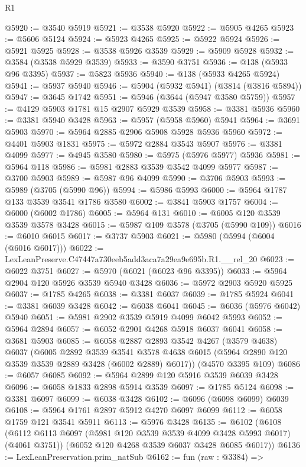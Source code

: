 \begin{lexlean}{R1}
\begin{coremodule}
@5920 := @3540 @5919
@5921 := @3538 @5920
@5922 := @5905 @4265
@5923 := @5606 @5124
@5924 := @5923 @4265
@5925 := @5922 @5924
@5926 := @5921 @5925
@5928 := @3538 @5926 @3539
@5929 := @5909 @5928
@5932 := @3584 (@3538 @5929 @3539)
@5933 := @3590 @3751
@5936 := @138 (@5933 @96 @3395)
@5937 := @5823 @5936
@5940 := @138 (@5933 @4265 @5924)
@5941 := @5937 @5940
@5946 := @5904 (@5932 @5941) (@3814 (@3816 @5894))
@5947 := @3645 @1742
@5951 := @5946 (@3644 (@5947 @3580 @5759))
@5957 := @4129 @5903 @1781 @15 @2907 @5929 @3539
@5958 := @3381 @5936
@5960 := @3381 @5940 @3428
@5963 := @5957 (@5958 @5960) @5941
@5964 := @3691 @5903
@5970 := @5964 @2885 @2906 @5908 @5928 @5936 @5960
@5972 := @4401 @5903 @1831
@5975 := @5972 @2884 @3543 @5907
@5976 := @3381 @4099
@5977 := @4945 @3580
@5980 := @5975 (@5976 @5977) @5936
@5981 := @5964 @118
@5986 := @5981 @2883 @3539 @3542 @4099 @5977
@5987 := @3700 @5903
@5989 := @5987 @96 @4099
@5990 := @3706 @5903
@5993 := @5989 (@3705 (@5990 @96))
@5994 := @5986 @5993
@6000 := @5964 @1787 @133 @3539 @3541 @1786 @3580
@6002 := @3841 @5903 @1757
@6004 := @6000 (@6002 @1786)
@6005 := @5964 @131
@6010 := @6005 @120 @3539 @3539 @3578 @3428
@6015 := @5987 @109 @3578 (@3705 (@5990 @109))
@6016 := @6010 @6015
@6017 := @3737 @5903
@6021 := @5980 (@5994 (@6004 (@6016 @6017)))
@6022 := LexLeanPreserve.C47447a730eeb5add3aca7a29ea9e695b.R1.__rel_20
@6023 := @6022 @3751
@6027 := @5970 (@6021 (@6023 @96 @3395))
@6033 := @5964 @2904 @120 @5926 @3539 @5940 @3428
@6036 := @5972 @2903 @5920 @5925
@6037 := @1785 @4265
@6038 := @3381 @6037
@6039 := @1785 @5924
@6041 := @3381 @6039 @3428
@6042 := @6038 @6041
@6045 := @6036 (@5976 @6042) @5940
@6051 := @5981 @2902 @3539 @5919 @4099 @6042 @5993
@6052 := @5964 @2894
@6057 := @6052 @2901 @4268 @5918 @6037 @6041
@6058 := @3681 @5903
@6085 := @6058
    @2887
    @2893
    @3542
    @4267
    (@3579 @4638)
    @6037
    (@6005
      @2892
      @3539
      @3541
      @3578
      @4638
      @6015
      (@5964 @2890 @120 @3539 @3539 @2889 @3428 (@6002 @2889) @6017))
    (@4570 @3395 @109)
@6086 := @6057 @6085
@6092 := @5964 @2899 @120 @5916 @3539 @6039 @3428
@6096 := @6058 @1833 @2898 @5914 @3539
@6097 := @1785 @5124
@6098 := @3381 @6097
@6099 := @6038 @3428
@6102 := @6096 (@6098 @6099) @6039
@6108 := @5964 @1761 @2897 @5912 @4270 @6097 @6099
@6112 := @6058 @1759 @121 @3541 @5911
@6113 := @5976 @3428
@6135 := @6102
    (@6108
      (@6112 @6113 @6097 (@5981 @120 @3539 @3539 @4099 @3428 @5993 @6017) (@4061 @3751))
      (@6052 @120 @4268 @3539 @6037 @3428 @6085 @6017))
@6136 := LexLeanPreservation.prim_natSub
@6162 := fun (raw : @3384) =>

\end{coremodule}
\end{lexlean}
